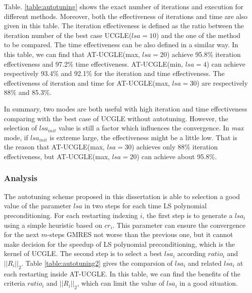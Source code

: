 Table. \ref{table:autotuning} shows the exact number of iterations and execution for different methods. Moreover, both the effectiveness of iterations and time are also given in this table. The iteration effectiveness is defined as the ratio between the iteration number of the best case UCGLE($lsa=10$) and the one of the method to be compared. The time effectiveness can be also defined in a similar way. In this table, we can find that AT-UCGLE(max, $lsa=20$) achieve 95.8\%  iteration effectiveness and 97.2\% time effectiveness. AT-UCGLE(min, $lsa=4$) can achieve respectively 93.4\% and 92.1\% for the iteration and time effectiveness. The effectiveness of iteration and time for AT-UCGLE(max, $lsa=30$) are respectively 88\% and 85.3\%.

In summary, two modes are both useful with high iteration and time effectiveness comparing with the best case of UCGLE without autotuning. However, the selection of $lsa_{init}$ value is still a factor which influences the convergence. In \textit{max} mode, if $lsa_{init}$ is extreme large, the effectiveness might be a little low. That is the reason that AT-UCGLE(max, $lsa=30$) achieves only 88\% iteration effectiveness, but AT-UCGLE(max, $lsa=20$) can achieve about 95.8\%.

\subsubsection{Analysis}

The autotuning scheme proposed in this dissertation is able to selection a good value of the parameter $lsa$ in two steps for each time LS polynomial preconditioning. For each restarting indexing $i$, the first step is to generate a $lsa_i$ using a simple heuristic based on $cr_i$. This parameter can ensure the convergence for the next $m$-steps GMRES not worse than the previous one, but it cannot make decision for the speedup of LS polynomial preconditioning, which is the kernel of UCGLE. The second step is to select a best $\overline{lsa_i}$ according $ratio_i$ and $||R_i||_2$. Table \ref{table:autotuning2} gives the comparsion of $lsa_i$ and related $\overline{lsa_i}$ at each restarting inside AT-UCGLE. In this table, we can find the benefits of the criteria $ratio_i$ and $||R_i||_2$, which can limit the value of $lsa_i$ in a good situation.

